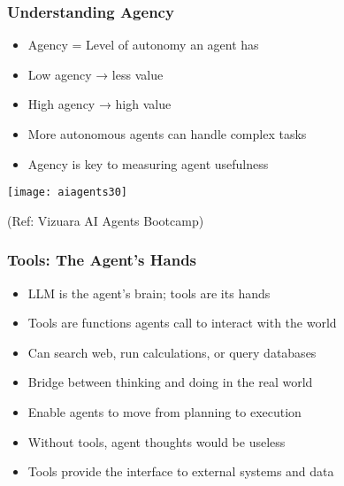 \begin{frame}[fragile]\frametitle{Understanding Agency}

      \begin{itemize}
        \item Agency = Level of autonomy an agent has
        \item Low agency → less value
        \item High agency → high value
        \item More autonomous agents can handle complex tasks
        \item Agency is key to measuring agent usefulness
      \end{itemize}

		\begin{center}
		\texttt{[image: aiagents30]}
		
		{\tiny (Ref: Vizuara AI Agents Bootcamp)}
		\end{center}	

\end{frame}

\begin{frame}[fragile]\frametitle{Tools: The Agent's Hands}
      \begin{itemize}
        \item LLM is the agent's brain; tools are its hands
        \item Tools are functions agents call to interact with the world
        \item Can search web, run calculations, or query databases
        \item Bridge between thinking and doing in the real world
        \item Enable agents to move from planning to execution
        \item Without tools, agent thoughts would be useless
        \item Tools provide the interface to external systems and data
      \end{itemize}
\end{frame}

